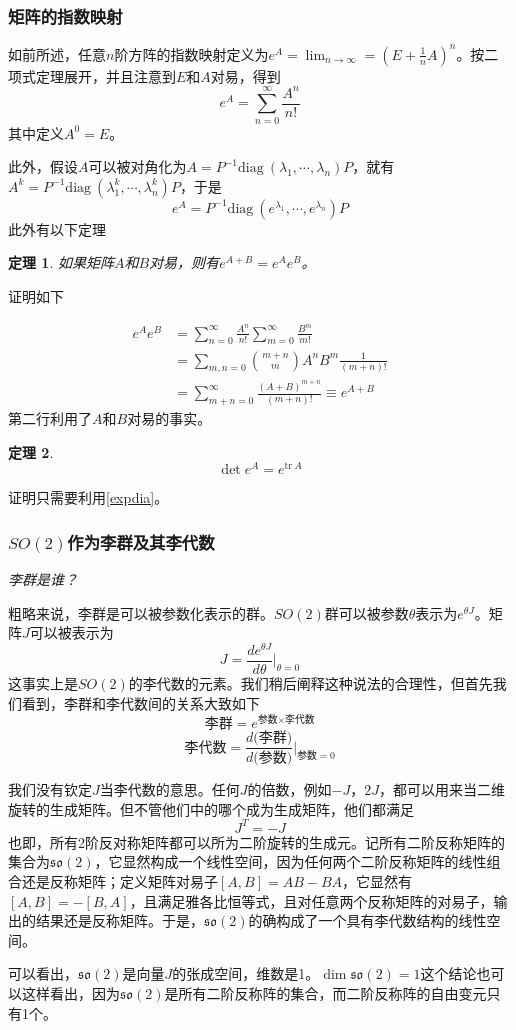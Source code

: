 \documentclass[a4paper,11pt]{ctexart}
\newcommand{\beq}{\begin{equation}}
\newcommand{\eeq}{\end{equation}}
\newcommand{\bea}{\begin{equation}\begin{aligned}}
\newcommand{\eea}{\end{aligned}\end{equation}}
\newcommand{\diag}{\mathrm{diag \ }}
\newcommand{\so}{\mathfrak{so}}
\newcommand{\tr}{\mathrm{tr\ }}
\newtheorem{thm}{定理}[section]
\begin{document}
\subsubsection{矩阵的指数映射}
如前所述，任意$n$阶方阵的指数映射定义为$e^A = \lim_{n \to \infty} = (E + \frac{1}{n} A)^n$。按二项式定理展开，并且注意到$E$和$A$对易，得到
\beq
e^A= \sum_{n=0}^{\infty} \frac{A^n}{n!}
\eeq
其中定义$A^0 = E$。
\par
此外，假设$A$可以被对角化为$A = P^{-1} \diag (\lambda_1,\cdots,\lambda_n) P$，就有$A^k = P^{-1} \diag (\lambda_1^k,\cdots ,\lambda_n^k) P$，于是
\beq \label{expdia}
e^A = P^{-1} \diag (e^{\lambda_1},\cdots,e^{\lambda_n}) P
\eeq
此外有以下定理
\begin{thm}
如果矩阵$A$和$B$对易，则有$e^{A+B} = e^Ae^B$。
\end{thm}
证明如下\par
\bea
e^A e^B &= \sum_{n=0}^{\infty} \frac{A^n}{n!} \sum_{m=0}^{\infty} \frac{B^m}{m!} \\
&= \sum_{m,n = 0} \binom{m+n}{m} A^n B^m     \frac{1}{(m+n)!} \\
&= \sum_{m+n = 0}^\infty \frac{(A+B)^{m+n}}{(m+n)!} \equiv e^{A+B}
\eea
第二行利用了$A$和$B$对易的事实。
\begin{thm}
\beq
\det e^A= e^{\tr A}
\eeq
\end{thm}
证明只需要利用\cref{expdia}。
\subsubsection{$SO(2)$作为李群及其李代数}
\emph{李群是谁？}\par
粗略来说，李群是可以被参数化表示的群。$SO(2)$群可以被参数$\theta$表示为$e^{\theta J}$。矩阵$J$可以被表示为
\beq
J = \frac{d e^{\theta J}}{d \theta}\bigg|_{\theta = 0}
\eeq
这事实上是$SO(2)$的李代数的元素。我们稍后阐释这种说法的合理性，但首先我们看到，李群和李代数间的关系大致如下
\beq
\text{李群} = e^{\text{参数} \times \text{李代数}}
\eeq
\beq
\text{李代数} = \frac{d \text{(李群)}}{d \text{(参数)}} \bigg|_{\text{参数} = 0}
\eeq
\par
我们没有钦定$J$当李代数的意思。任何$J$的倍数，例如$-J$，$2J$，都可以用来当二维旋转的生成矩阵。但不管他们中的哪个成为生成矩阵，他们都满足
\beq
J^T = -J
\eeq
也即，所有2阶反对称矩阵都可以所为二阶旋转的生成元。记所有二阶反称矩阵的集合为$\so(2)$，它显然构成一个线性空间，因为任何两个二阶反称矩阵的线性组合还是反称矩阵；定义矩阵对易子$[A,B] = AB - BA$，它显然有$[A,B] = - [B,A]$，且满足雅各比恒等式，且对任意两个反称矩阵的对易子，输出的结果还是反称矩阵。于是，$\so(2)$的确构成了一个具有李代数结构的线性空间。
\par
可以看出，$\so(2)$是向量$J$的张成空间，维数是1。$\dim \so(2) = 1$这个结论也可以这样看出，因为$\so(2)$是所有二阶反称阵的集合，而二阶反称阵的自由变元只有1个。
\end{document}
